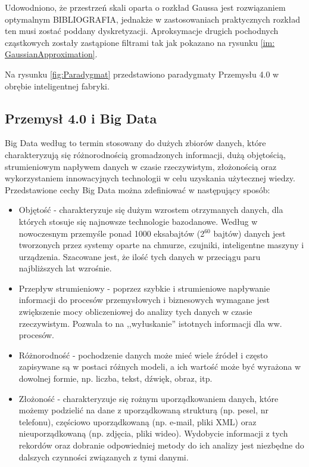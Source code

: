 Udowodniono, że przestrzeń skali oparta o rozkład Gaussa jest rozwiązaniem optymalnym {BIBLIOGRAFIA}, jednakże w zastosowaniach praktycznych rozkład ten musi zostać poddany dyskretyzacji. Aproksymacje drugich pochodnych cząstkowych zostały zastąpione filtrami tak jak pokazano na rysunku \ref{im: GaussianApproximation}. 


Na rysunku \ref{fig:Paradygmat} przedstawiono paradygmaty Przemysłu 4.0 w obrębie inteligentnej fabryki. 


\subsection{Przemysł 4.0 i Big Data}

Big Data według \cite{BigDataTabakow} to termin stosowany do dużych zbiorów danych, które charakteryzują się różnorodnością gromadzonych informacji, dużą objętością, strumieniowym napływem danych w czasie rzeczywistym, złożonością oraz wykorzystaniem innowacyjnych technologii w celu uzyskania użytecznej wiedzy. Przedstawione cechy Big Data można zdefiniować w następujący sposób: 

\begin{itemize}
	\item Objętość - charakteryzuje się dużym wzrostem otrzymanych danych, dla których stosuje się najnowsze technologie bazodanowe. Według \cite{Industry40} w nowoczesnym przemyśle ponad 1000 eksabajtów (2$^{60}$ bajtów) danych jest tworzonych przez systemy oparte na chmurze, czujniki, inteligentne maszyny i urządzenia. Szacowane jest, że ilość tych danych w przeciągu paru najbliższych lat wzrośnie.
	
	\item Przepływ strumieniowy - poprzez szybkie i strumieniowe napływanie informacji do procesów przemysłowych i biznesowych wymagane jest zwiększenie mocy obliczeniowej do analizy tych danych w czasie rzeczywistym. Pozwala to na ,,wyłuskanie'' istotnych informacji dla ww. procesów.
	
	\item Różnorodność - pochodzenie danych może mieć wiele źródeł i często zapisywane są w postaci różnych modeli, a ich wartość może być wyrażona w dowolnej formie, np. liczba, tekst, dźwięk, obraz, itp.
	
	\item Złożoność - charakteryzuje się rożnym uporządkowaniem danych, które możemy podzielić na dane z uporządkowaną strukturą (np. pesel, nr telefonu), częściowo uporządkowaną (np. e-mail, pliki XML) oraz nieuporządkowaną (np. zdjęcia, pliki wideo). Wydobycie informacji z tych rekordów oraz dobranie odpowiedniej metody do ich analizy jest niezbędne do dalszych czynności związanych z tymi danymi. 
	
\end{itemize} 


